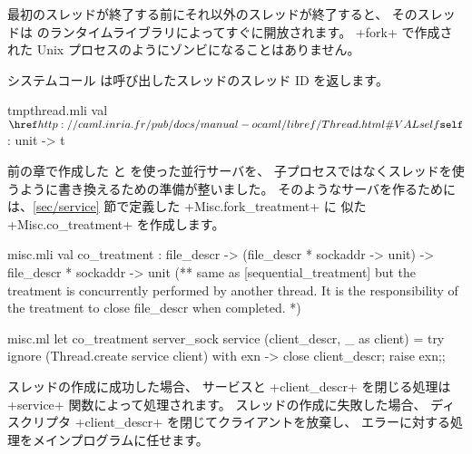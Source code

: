 最初のスレッドが終了する前にそれ以外のスレッドが終了すると、
そのスレッドは \ocaml のランタイムライブラリによってすぐに開放されます。
\ml+fork+ で作成された Unix プロセスのようにゾンビになることはありません。

システムコール  は呼び出したスレッドのスレッド ID を返します。
\begin{listingcodefile}{tmpthread.mli}
val $\libvalue{Thread}{self}$ : unit -> t
\end{listingcodefile}

前の章で作成した  と  を使った並行サーバを、
子プロセスではなくスレッドを使うように書き換えるための準備が整いました。
そのようなサーバを作るためには、\ref{sec/service} 節で定義した \ml+Misc.fork_treatment+ に
似た \ml+Misc.co_treatment+ を作成します。

%
\begin{codefile}{misc.mli}
val co_treatment :
file_descr -> (file_descr * sockaddr -> unit) ->
file_descr * sockaddr -> unit
(** same as [sequential_treatment] but the treatment is concurrently
 performed by another thread. It is the responsibility of the treatment
 to close file_descr when completed. *)
\end{codefile}
%
\begin{listingcodefile}{misc.ml}
let co_treatment server_sock service (client_descr, _ as client) =
  try ignore (Thread.create service client)
  with exn -> close client_descr; raise exn;;
\end{listingcodefile}
%
スレッドの作成に成功した場合、
サービスと \ml+client_descr+ を閉じる処理は \ml+service+ 関数によって処理されます。
スレッドの作成に失敗した場合、
ディスクリプタ \ml+client_descr+ を閉じてクライアントを放棄し、
エラーに対する処理をメインプログラムに任せます。

